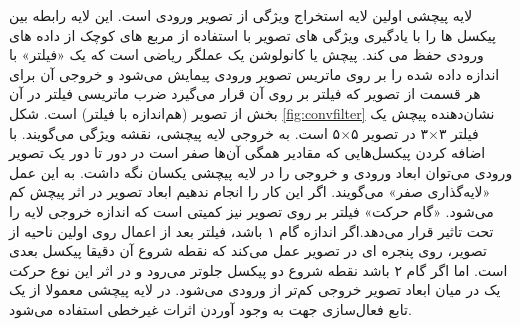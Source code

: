 
لایه پیچشی اولین لایه استخراج ویژگی از تصویر ورودی است. این لایه رابطه بین پیکسل ها را با یادگیری ویژگی های تصویر با استفاده از مربع های کوچک از داده های ورودی حفظ می کند. پیچش یا کانولوشن یک عملگر ریاضی است که یک «فیلتر» با اندازه داده شده را بر روی ماتریس تصویر ورودی پیمایش می‌شود و خروجی آن برای هر قسمت از تصویر که فیلتر بر روی آن قرار می‌گیرد ضرب ماتریسی فیلتر در آن بخش از تصویر (هم‌اندازه با فیلتر) است. شکل 
\ref{fig:convfilter}
نشان‌دهنده پیچش یک فیلتر
 ۳$\times$۳
 در تصویر
 	۵$\times$۵ 
 	است.
 	 به خروجی لایه پیچشی، نقشه ویژگی
 	 می‌گویند.  
با اضافه کردن پیکسل‌هایی که مقادیر همگی آن‌ها صفر است در دور تا دور یک تصویر ورودی می‌توان ابعاد ورودی و خروجی را در لایه پیچشی یکسان نگه داشت. به این عمل «لایه‌گذاری صفر»
می‌گویند. اگر این کار را انجام ندهیم ابعاد تصویر در اثر پیچش کم می‌شود. «گام حرکت» 
فیلتر بر روی تصویر نیز کمیتی است که اندازه خروجی لایه را تحت تاثیر قرار می‌دهد.اگر اندازه گام ۱ باشد، فیلتر بعد از اعمال روی اولین ناحیه از تصویر، روی پنجره ای در تصویر عمل می‌کند که نقطه شروع آن دقیقا پیکسل بعدی است. اما اگر گام ۲ باشد نقطه شروع دو پیکسل جلوتر می‌رود و در اثر این نوع حرکت یک در میان ابعاد تصویر خروجی کم‌تر از ورودی می‌شود. در لایه پیچشی معمولا از یک تابع فعال‌سازی جهت به وجود آوردن اثرات غیرخطی استفاده می‌شود.

